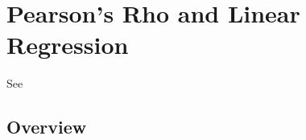 \newpage
\section{Pearson's Rho and Linear Regression}
\label{PearsonRhoTest}

See \cite{Balakrishnan_2009}

\subsection{Overview}
\label{PearsonRhoTestOverview}

\lipsum[2]
%
%
%
%
%
%
%
%
%
%

